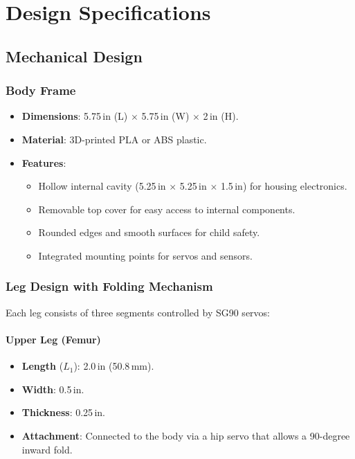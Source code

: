 \documentclass{article}
\begin{document}
\section{Design Specifications}

\subsection{Mechanical Design}

\subsubsection{Body Frame}

\begin{itemize}
    \item \textbf{Dimensions}: 5.75\,in (L) $\times$ 5.75\,in (W) $\times$ 2\,in (H).
    \item \textbf{Material}: 3D-printed PLA or ABS plastic.
    \item \textbf{Features}:
    \begin{itemize}
        \item Hollow internal cavity (5.25\,in $\times$ 5.25\,in $\times$ 1.5\,in) for housing electronics.
        \item Removable top cover for easy access to internal components.
        \item Rounded edges and smooth surfaces for child safety.
        \item Integrated mounting points for servos and sensors.
    \end{itemize}
\end{itemize}

\subsubsection{Leg Design with Folding Mechanism}

Each leg consists of three segments controlled by SG90 servos:

\paragraph{Upper Leg (Femur)}

\begin{itemize}
    \item \textbf{Length} ($L_1$): 2.0\,in (50.8\,mm).
    \item \textbf{Width}: 0.5\,in.
    \item \textbf{Thickness}: 0.25\,in.
    \item \textbf{Attachment}: Connected to the body via a hip servo that allows a 90-degree inward fold.
\end{itemize}
\end{document}

